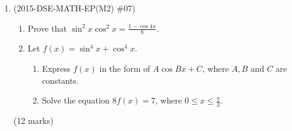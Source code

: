 \documentclass[12pt]{article}
\begin{document}
\begin{enumerate}
            \hrulefill
            
            \hrulefill
            
            \hrulefill
            
            \hrulefill
            
            \hrulefill
            
            \hrulefill
            
            \hrulefill
            
            \hrulefill
            
            \hrulefill
            
            \hrulefill
            
            \hrulefill
            
            \hrulefill
            
            \hrulefill
            
            \hrulefill
            
            \hrulefill
            
            \hrulefill

        \pagebreak
        \item (2015-DSE-MATH-EP(M2) \#07)  \begin{enumerate}
            \item Prove that $\displaystyle\sin^2{x}\cos^2{x}=\frac{1-\cos{4x}}{8}$.
            \item Let $f(x)=\sin^4{x}+\cos^4{x}$.\begin{enumerate}
                \item Express $f(x)$ in the form of $A\cos{Bx}+C$, where $A,B$ and $C$ are constants.
                \item Solve the equation $8f(x)=7$, where $0\leq x\leq \frac{\pi}{2}$.
            \end{enumerate}
        \end{enumerate}\hfill(12 marks)
            
            \hrulefill
            
            \hrulefill
            
            \hrulefill
            
            \hrulefill
            
            \hrulefill
            
            \hrulefill
            
            \hrulefill
            

\end{enumerate}
\end{document}
